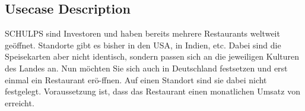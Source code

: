 \subsection{Usecase Description}
\label{subsec:usecase}

SCHULPS sind Investoren und haben bereits mehrere Restaurants weltweit geöffnet.
Standorte gibt es bisher in den USA, in Indien, etc. Dabei sind die Speisekarten aber nicht identisch, sondern passen sich an die jeweiligen Kulturen des Landes an.
Nun möchten Sie sich auch in Deutschland festsetzen und erst einmal ein Restaurant erö-ffnen. Auf einen Standort sind sie dabei nicht festgelegt.
Voraussetzung ist, dass das Restaurant einen monatlichen Umsatz von  erreicht.
